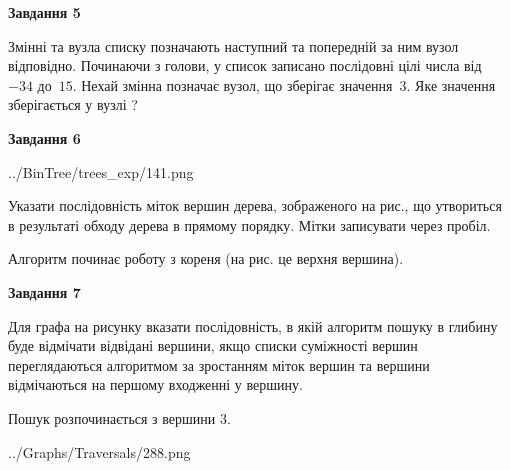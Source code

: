 \documentclass[12pt, ukrainian]{article}
\begin{document}
{\begin {large}
{\begin {center}\textbf{Завдання 5}\end {center}}\par
Змінні  та  вузла списку позначають наступний та попередній за ним вузол відповідно. Починаючи з голови, у список записано послідовні цілі числа від~$-34$ до~$15$. Нехай змінна  позначає вузол, що зберігає значення~$3$.
Яке значення зберігається у вузлі  ?\par
\newpage

{\begin {center}\textbf{Завдання 6}\end {center}}\par

\begin{center}
	{../BinTree/trees_exp/141.png}
\end{center}
Указати послідовність міток вершин дерева, зображеного на рис., що утвориться в результаті обходу дерева в прямому порядку. Мітки записувати через пробіл.\par Алгоритм починає роботу з кореня (на рис. це верхня вершина).\par
\newpage

{\begin {center}\textbf{Завдання 7}\end {center}}\par
Для графа на рисунку вказати послідовність, в якій алгоритм пошуку в глибину буде відмічати відвідані вершини, якщо списки суміжності вершин переглядаються алгоритмом за зростанням міток вершин та вершини відмічаються на першому вход\-женні у вершину.\par
Пошук розпочинається з вершини 3.\par

\begin{center}
	{../Graphs/Traversals/288.png}
\end{center}\par
\newpage


\end{large}}
\end{document}
